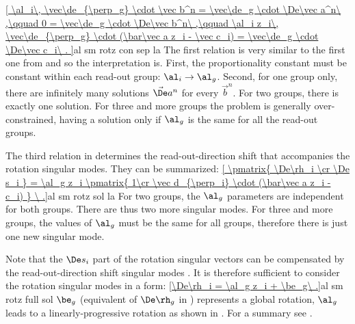 \eqref{
	\al_i\, \vec\de_{\perp_g} \cdot \vec b^n = \vec\de_g \cdot \De\vec a^n\ ,\qquad
	0 = \vec\de_g \cdot \De\vec b^n\ ,\qquad
	\al_i z_i\, \vec\de_{\perp_g} \cdot (\bar\vec a z_i - \vec c_i) = \vec\de_g \cdot \De\vec c_i\ .
}{al sm rotz con sep la}
The first relation is very similar to the first one from  and so the interpretation is. First, the proportionality constant must be constant within each read-out group: $\al_i\to \al_g$. Second, for one group only, there are infinitely many solutions $\vec\De a^n$ for every $\vec b^n$. For two groups, there is exactly one solution. For three and more groups the problem is generally over-constrained, having a solution only if $\al_g$ is the same for all the read-out groups.

The third relation in  determines the read-out-direction shift that accompanies the rotation singular modes. They can be summarized:
\eqref{
\pmatrix{
	\De\rh_i \cr
	\De s_i
	}
= \al_g z_i \pmatrix{
	1\cr
	\vec d_{\perp_i} \cdot (\bar\vec a z_i - c_i)
}
\ .}{al sm rotz sol la}
For two groups, the $\al_g$ parameters are independent for both groups. There are thus two more singular modes. For three and more groups, the values of $\al_g$ must be the same for all groups, therefore there is just one new singular mode.

Note that the $\De s_i$ part of the rotation singular vectors  can be compensated by the read-out-direction shift singular modes . It is therefore sufficient to consider the rotation singular modes in a form:
\eqref{\De\rh_i = \al_g z_i + \be_g\ .}{al sm rotz full sol}
$\be_g$ (equivalent of $\De\rh_g$ in ) represents a global rotation, $\al_g$ leads to a linearly-progressive rotation as shown in . For a summary see .


